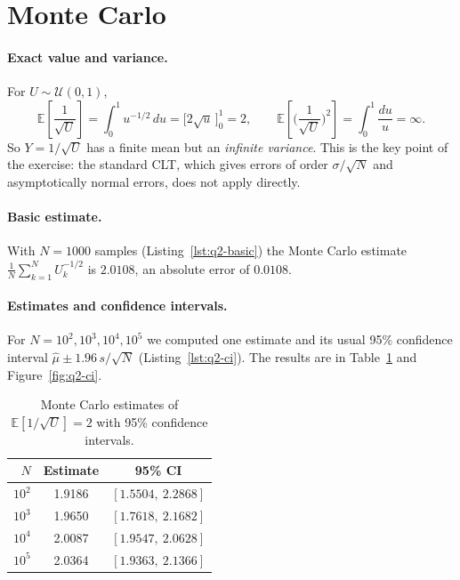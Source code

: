 \documentclass[11pt,a4paper]{article}
\begin{document}
\section{Monte Carlo}

\paragraph{Exact value and variance.} For $U \sim \mathcal U(0,1)$,
\[
  \mathbb E\!\left[\frac{1}{\sqrt U}\right] = \int_0^1 u^{-1/2}\,du = \big[2\sqrt u\,\big]_0^1 = 2,
  \qquad
  \mathbb E\!\left[\Big(\frac{1}{\sqrt U}\Big)^2\right] = \int_0^1 \frac{du}{u} = \infty .
\]
So $Y = 1/\sqrt U$ has a finite mean but an \emph{infinite variance}. This is the key point of
the exercise: the standard CLT, which gives errors of order $\sigma/\sqrt N$ and asymptotically
normal errors, does not apply directly.

\paragraph{Basic estimate.} With $N = 1000$ samples (Listing~\ref{lst:q2-basic}) the Monte Carlo
estimate $\frac1N\sum_{k=1}^N U_k^{-1/2}$ is $2.0108$, an absolute error of $0.0108$.

\paragraph{Estimates and confidence intervals.} For $N = 10^2, 10^3, 10^4, 10^5$ we computed one
estimate and its usual 95\% confidence interval $\hat\mu \pm 1.96\,s/\sqrt N$
(Listing~\ref{lst:q2-ci}). The results are in Table~\ref{tab:q2-ci} and
Figure~\ref{fig:q2-ci}.

\begin{table}[H]
  \centering
  \begin{tabular}{rcc}
    \toprule
    $N$ & Estimate & 95\% CI \\
    \midrule
    $10^2$ & 1.9186 & $[1.5504,\ 2.2868]$ \\
    $10^3$ & 1.9650 & $[1.7618,\ 2.1682]$ \\
    $10^4$ & 2.0087 & $[1.9547,\ 2.0628]$ \\
    $10^5$ & 2.0364 & $[1.9363,\ 2.1366]$ \\
    \bottomrule
  \end{tabular}
  \caption{Monte Carlo estimates of $\mathbb E[1/\sqrt U] = 2$ with 95\% confidence intervals.}
  \label{tab:q2-ci}
\end{table}
\end{document}
